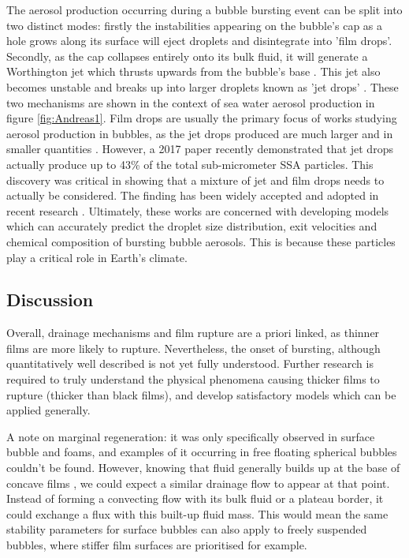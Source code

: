 \documentclass[a4paper,12pt]{article}
\numberwithin{equation}{section}
\numberwithin{figure}{section}
\numberwithin{table}{section}
\begin{document}
The aerosol production occurring during a bubble bursting event can be split into two distinct modes: firstly the instabilities appearing on the bubble's cap as a hole grows along its surface will eject droplets and disintegrate into 'film drops'. Secondly, as the cap collapses entirely onto its bulk fluid, it will generate a Worthington jet which thrusts upwards from the bubble's base \cite{Lhuissier2011}. This jet also becomes unstable and breaks up into larger droplets known as 'jet drops' \cite{Spiel1998, Lhuissier2011}. These two mechanisms are shown in the context of sea water aerosol production in figure \ref{fig:Andreas1}. Film drops are usually the primary focus of works studying aerosol production in bubbles, as the jet drops produced are much larger and in smaller quantities \cite{Wu1989, Modini2013, Spiel1998, Lhuissier2011}. However, a 2017 paper \cite{Wang2017} recently demonstrated that jet drops actually produce up to 43\% of the total sub-micrometer SSA particles. This discovery was critical in showing that a mixture of jet and film drops needs to actually be considered. The finding has been widely accepted and adopted in recent research \cite{Bertram2018, Deike2018}. Ultimately, these works are concerned with developing models which can accurately predict the droplet size distribution, exit velocities and chemical composition of bursting bubble aerosols. This is because these particles play a critical role in Earth's climate.

\subsection{Discussion}
Overall, drainage mechanisms and film rupture are a priori linked, as thinner films are more likely to rupture. Nevertheless, the onset of bursting, although quantitatively well described is not yet fully understood. Further research is required to truly understand the physical phenomena causing thicker films to rupture (thicker than black films), and develop satisfactory models which can be applied generally.

A note on marginal regeneration: it was only specifically observed in surface bubble and foams, and examples of it occurring in free floating spherical bubbles couldn't be found. However, knowing that fluid generally builds up at the base of concave films \cite{Shen2020}, we could expect a similar drainage flow to appear at that point. Instead of forming a convecting flow with its bulk fluid or a plateau border, it could exchange a flux with this built-up fluid mass. This would mean the same stability parameters for surface bubbles can also apply to freely suspended bubbles, where stiffer film surfaces are prioritised for example.
\end{document}
